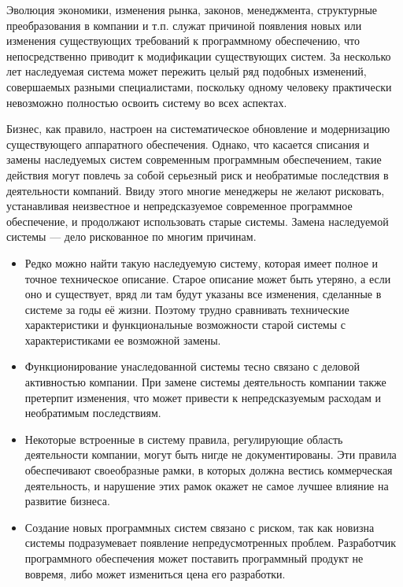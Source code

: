 \documentclass{../../text-style}
\begin{document}
Эволюция экономики, изменения рынка, законов, менеджмента, структурные преобразования в компании и т.п. служат причиной появления новых или изменения существующих требований к программному обеспечению, что непосредственно приводит к модификации существующих систем. За несколько лет наследуемая система может пережить целый ряд подобных изменений, совершаемых разными специалистами, поскольку одному человеку практически невозможно полностью освоить систему во всех аспектах.

Бизнес, как правило, настроен на систематическое обновление и модернизацию существующего аппаратного обеспечения. Однако, что касается списания и замены наследуемых систем современным программным обеспечением, такие действия могут повлечь за собой серьезный риск и необратимые последствия в деятельности компаний. Ввиду этого многие менеджеры не желают рисковать, устанавливая неизвестное и непредсказуемое современное программное обеспечение, и продолжают использовать старые системы. Замена наследуемой системы --- дело рискованное по многим причинам.

\begin{itemize}
    \item Редко можно найти такую наследуемую систему, которая имеет полное и точное техническое описание. Старое описание может быть утеряно, а если оно и существует, вряд ли там будут указаны все изменения, сделанные в системе за годы её жизни. Поэтому трудно сравнивать технические характеристики и функциональные возможности старой системы с характеристиками ее возможной замены.
    \item Функционирование унаследованной системы тесно связано с деловой активностью компании. При замене системы деятельность компании также претерпит изменения, что может привести к непредсказуемым расходам и необратимым последствиям.
    \item Некоторые встроенные в систему правила, регулирующие область деятельности компании, могут быть нигде не документированы. Эти правила обеспечивают своеобразные рамки, в которых должна вестись коммерческая деятельность, и нарушение этих рамок окажет не самое лучшее влияние на развитие бизнеса. 
    \item Создание новых программных систем связано с риском, так как новизна системы подразумевает появление непредусмотренных проблем. Разработчик программного обеспечения может поставить программный продукт не вовремя, либо может измениться цена его разработки.
\end{itemize}
\end{document}
